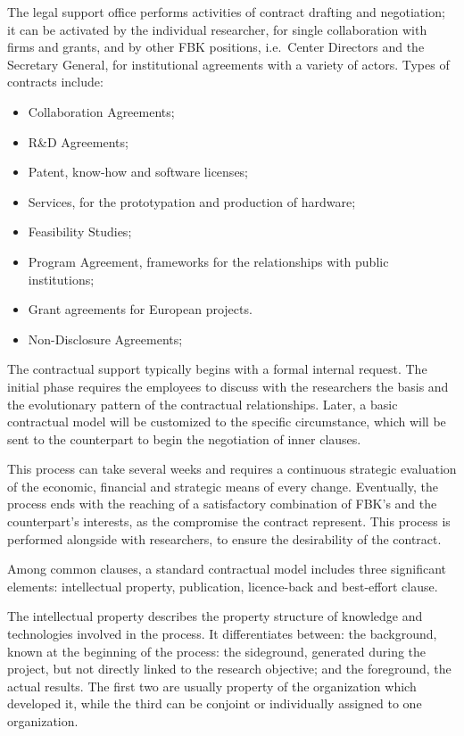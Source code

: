 The legal support office performs activities of contract drafting and negotiation; it can be activated by the individual researcher, for single collaboration with firms and grants, and by other FBK positions, i.e.\ Center Directors and the Secretary General, for institutional agreements with a variety of actors. Types of contracts include:

\begin{itemize}

\item Collaboration Agreements; 
\item R\&D Agreements; 
\item Patent, know-how and software licenses; 
\item Services, for the prototypation and production of hardware;
\item Feasibility Studies; 
\item Program Agreement, frameworks for the relationships with public institutions; 
\item Grant agreements for European projects. 
\item Non-Disclosure Agreements; 

\end{itemize}

The contractual support typically begins with a formal internal request. The initial phase requires the employees to discuss with the researchers the basis and the evolutionary pattern of the contractual relationships. Later, a basic contractual model will be customized to the specific circumstance, which will be sent to the counterpart to begin the negotiation of inner clauses. 
 
This process can take several weeks and requires a continuous strategic evaluation of the economic, financial and strategic means of every change. Eventually, the process ends with the reaching of a satisfactory combination of FBK’s and the counterpart’s interests, as the compromise the contract represent. This process is performed alongside with researchers, to ensure the desirability of the contract.

Among common clauses, a standard contractual model includes three significant elements: intellectual property, publication, licence-back and best-effort clause.

The intellectual property describes the property structure of knowledge and technologies involved in the process. It differentiates between: the background, known at the beginning of the process: the sideground, generated during the project, but not directly linked to the research objective; and the foreground, the actual results. The first two are usually property of the organization which developed it, while the third can be conjoint or individually assigned to one organization. 

